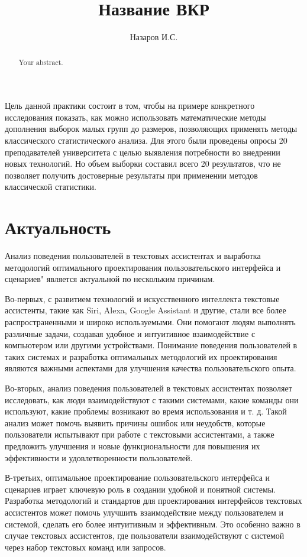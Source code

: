 \documentclass{article}
\title{Название ВКР}
\author{Назаров И.С.}
\begin{document}
\maketitle

\begin{abstract}
Your abstract.
\end{abstract}


Цель данной практики состоит в том, чтобы на примере конкретного 
исследования показать, как можно использовать математические методы 
дополнения выборок малых групп до размеров, позволяющих применять 
методы классического статистического анализа. Для этого были 
проведены опросы 20 преподавателей университета с целью выявления 
потребности во внедрении новых технологий. Но объем выборки составил всего 20 результатов, что не позволяет получить достоверные результаты 
при применении методов классической статистики.


\section{Актуальность}
Анализ поведения пользователей в текстовых ассистентах и выработка методологий оптимального проектирования пользовательского интерфейса и сценариев" является актуальной по нескольким причинам.

Во-первых, с развитием технологий и искусственного интеллекта текстовые ассистенты, такие как Siri, Alexa, Google Assistant и другие, стали все более распространенными и широко используемыми. Они помогают людям выполнять различные задачи, создавая удобное и интуитивное взаимодействие с компьютером или другими устройствами. Понимание поведения пользователей в таких системах и разработка оптимальных методологий их проектирования являются важными аспектами для улучшения качества пользовательского опыта.

Во-вторых, анализ поведения пользователей в текстовых ассистентах позволяет исследовать, как люди взаимодействуют с такими системами, какие команды они используют, какие проблемы возникают во время использования и т. д. Такой анализ может помочь выявить причины ошибок или неудобств, которые пользователи испытывают при работе с текстовыми ассистентами, а также предложить улучшения и новые функциональности для повышения их эффективности и удовлетворенности пользователей.

В-третьих, оптимальное проектирование пользовательского интерфейса и сценариев играет ключевую роль в создании удобной и понятной системы. Разработка методологий и стандартов для проектирования интерфейсов текстовых ассистентов может помочь улучшить взаимодействие между пользователем и системой, сделать его более интуитивным и эффективным. Это особенно важно в случае текстовых ассистентов, где пользователи взаимодействуют с системой через набор текстовых команд или запросов.
\end{document}
